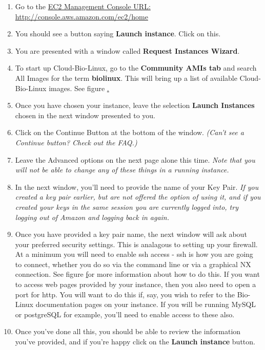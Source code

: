
\begin{enumerate}
\item Go to the \href{http://console.aws.amazon.com/ec2/home}{EC2 Management Console URL: http://console.aws.amazon.com/ec2/home}
\item You should see a button saying \textbf{Launch instance}. Click on this. 
\item You are presented with a window called \textbf{Request Instances Wizard}. 
\item To start up Cloud-Bio-Linux, go to the \textbf{Community AMIs tab} and search All Images for the term \textbf{biolinux}. This will bring up a list of available Cloud-Bio-Linux images. See figure \href{fig:requestInstance}.
\item Once you have chosen your instance, leave the selection \textbf{Launch Instances} chosen in the next window presented to you.
\item Click on the Continue Button at the bottom of the window. \emph{(Can't see a Continue button? Check out the FAQ.)}
\item Leave the Advanced options on the next page alone this time. \emph{Note that you will not be able to change any of these things in a running instance.}
\item In the next window, you'll need to provide the name of your Key Pair. \emph{If you created a key pair earlier, but are not offered the option of using it, and if you created your keys in the same session you are currently logged into, try logging out of Amazon and logging back in again.}
\item Once you have provided a key pair name, the next window will ask about your preferred security settings. This is analagous to setting up your firewall. At a minimum you will need to enable ssh access - ssh is how you are going to connect, whether you do so via the command line or via a graphical NX connection. See figure \href{fig:openssh} for more information about how to do this. If you want to access web pages provided by your instance, then you also need to open a port for http. You will want to do this if, say, you wish to refer to the Bio-Linux documentation pages on your instance. If you will be running MySQL or postgreSQL for example, you'll need to enable access to these also.
\item Once you've done all this, you should be able to review the information you've provided, and if you're happy click on the \textbf{Launch instance} button.
\end{enumerate}


